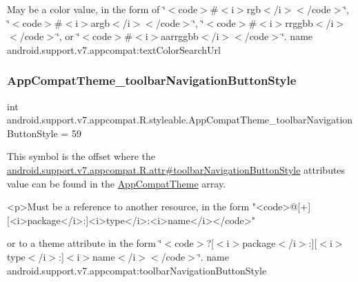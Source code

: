 May be a color value, in the form of \char`\"{}$<$code$>$\#$<$i$>$rgb$<$/i$>$$<$/code$>$\char`\"{}, \char`\"{}$<$code$>$\#$<$i$>$argb$<$/i$>$$<$/code$>$\char`\"{}, \char`\"{}$<$code$>$\#$<$i$>$rrggbb$<$/i$>$$<$/code$>$\char`\"{}, or \char`\"{}$<$code$>$\#$<$i$>$aarrggbb$<$/i$>$$<$/code$>$\char`\"{}.  name android.\+support.\+v7.\+appcompat\+:text\+Color\+Search\+Url \mbox{\label{classandroid_1_1support_1_1v7_1_1appcompat_1_1R_1_1styleable_ad578ce7888cd20c22c0f76c70ac3e899}} 
\subsubsection{\texorpdfstring{App\+Compat\+Theme\+\_\+toolbar\+Navigation\+Button\+Style}{AppCompatTheme\_toolbarNavigationButtonStyle}}
{\footnotesize\ttfamily int android.\+support.\+v7.\+appcompat.\+R.\+styleable.\+App\+Compat\+Theme\+\_\+toolbar\+Navigation\+Button\+Style = 59\hspace{0.3cm}{\ttfamily [static]}}

This symbol is the offset where the \hyperlink{classandroid_1_1support_1_1v7_1_1appcompat_1_1R_1_1attr_ae7c3c73d23efd4eedd165383feacbf68}{android.\+support.\+v7.\+appcompat.\+R.\+attr\#toolbar\+Navigation\+Button\+Style} attribute\textquotesingle{}s value can be found in the \hyperlink{classandroid_1_1support_1_1v7_1_1appcompat_1_1R_1_1styleable_a5c42f89e8a410c323be34208d75c430b}{App\+Compat\+Theme} array.

\begin{DoxyVerb}      <p>Must be a reference to another resource, in the form "<code>@[+][<i>package</i>:]<i>type</i>:<i>name</i></code>"
\end{DoxyVerb}
 or to a theme attribute in the form \char`\"{}$<$code$>$?\mbox{[}$<$i$>$package$<$/i$>$\+:\mbox{]}\mbox{[}$<$i$>$type$<$/i$>$\+:\mbox{]}$<$i$>$name$<$/i$>$$<$/code$>$\char`\"{}.  name android.\+support.\+v7.\+appcompat\+:toolbar\+Navigation\+Button\+Style \mbox{\label{classandroid_1_1support_1_1v7_1_1appcompat_1_1R_1_1styleable_a1e7ba103613221a76d37b259fde162e4}} 
